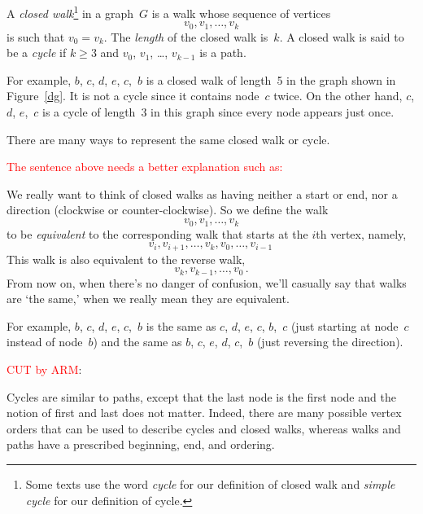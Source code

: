 \begin{definition}
A \emph{closed walk}\footnote{Some texts use the word \emph{cycle} for
  our definition of closed walk and \emph{simple cycle} for our
  definition of cycle.} in a graph~$G$ is a walk whose sequence of vertices
\begin{equation*}
    v_0, v_1, \dots, v_k
\end{equation*}
is such that $v_0=v_k$.  The \emph{length} of
the closed walk is~$k$.  A closed walk is said to be a \emph{cycle} if
$k \ge 3$ and $v_0$, $v_1$, \dots, $v_{k - 1}$ is a path.
\end{definition}

For example, $b$, $c$, $d$, $e$, $c$,~$b$ is a closed walk of
length~5 in the graph shown in Figure~\ref{dg}.  It is not a cycle
since it contains node~$c$ twice.  On the other hand, $c$, $d$,
$e$,~$c$ is a cycle of length~3 in this graph since every node
appears just once.

There are many ways to represent the same closed walk or cycle.

\begin{editingnotes}
\textcolor{red}{The sentence above needs a better explanation such as:}

We really want to think of closed walks as having neither a start or
end, nor a direction (clockwise or counter-clockwise).  So we define
the walk
\[
v_0, v_1, \dots, v_k
\]
to be \emph{equivalent} to the corresponding walk that starts at the $i$th vertex, namely,
\[
v_i, v_{i+1},\dots, v_k,v_0,\dots,v_{i-1}\,
\]
This walk is also equivalent to the reverse walk,
\[
v_k, v_{k-1},\dots, v_0\, .
\]
From now on, when there's no danger of confusion, we'll casually say
that walks are `the same,' when we really mean they are equivalent.
\end{editingnotes}
For example, $b$, $c$, $d$, $e$, $c$,~$b$ is the same as $c$, $d$,
$e$, $c$, $b$,~$c$ (just starting at node~$c$ instead of node~$b$) and
the same as $b$, $c$, $e$, $d$, $c$,~$b$ (just reversing the
direction).
\begin{editingnotes}
\textcolor{red}{CUT by ARM}:

Cycles are similar to paths, except that the last node is the first
node and the notion of first and last does not matter.  Indeed, there
are many possible vertex orders that can be used to describe cycles
and closed walks, whereas walks and paths have a prescribed beginning,
end, and ordering.
\end{editingnotes}

